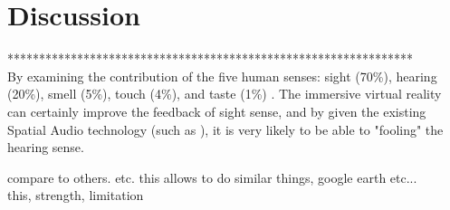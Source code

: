 \label{chapter-discussion}
\chapter{Discussion}

****************************************************************\\%
By examining the contribution of  the five human senses: sight (70\%), hearing (20\%), smell (5\%), touch (4\%), and taste (1\%) \parencite{mazuryk.vr.1996}. The immersive virtual reality can certainly improve the feedback of sight sense, and by given the existing Spatial Audio technology (such as \parencite{google.spatial-audio.2016}), it is very likely to be able to "fooling" the hearing sense. 

compare to others. etc. this allows to do similar things, google earth etc...\\
this, strength, limitation

